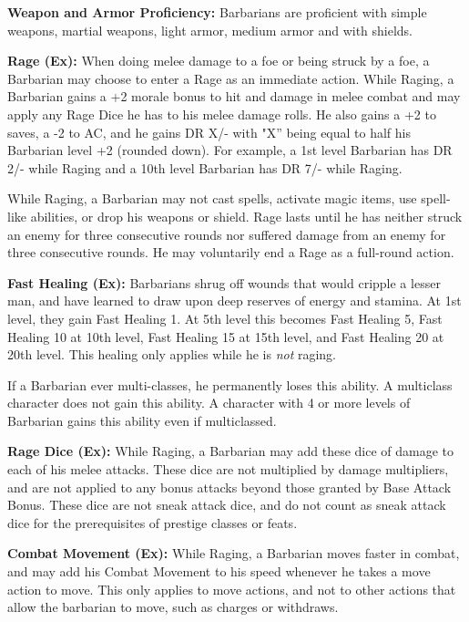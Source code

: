 \classfeatures

\textbf{Weapon and Armor Proficiency:} Barbarians are proficient with simple weapons, martial weapons, light armor, medium armor and with shields.

\textbf{Rage (Ex):} When doing melee damage to a foe or being struck by a foe, a Barbarian may choose to enter a Rage as an immediate action. While Raging, a Barbarian gains a +2 morale bonus to hit and damage in melee combat and may apply any Rage Dice he has to his melee damage rolls. He also gains a +2 to saves, a -2 to AC, and he gains DR X/- with "X'' being equal to half his Barbarian level +2 (rounded down). For example, a 1st level Barbarian has DR 2/- while Raging and a 10th level Barbarian has DR 7/- while Raging.

While Raging, a Barbarian may not cast spells, activate magic items, use spell-like abilities, or drop his weapons or shield. Rage lasts until he has neither struck an enemy for three consecutive rounds nor suffered damage from an enemy for three consecutive rounds. He may voluntarily end a Rage as a full-round action.

\textbf{Fast Healing (Ex):} Barbarians shrug off wounds that would cripple a lesser man, and have learned to draw upon deep reserves of energy and stamina. At 1st level, they gain Fast Healing 1. At 5th level this becomes Fast Healing 5, Fast Healing 10 at 10th level, Fast Healing 15 at 15th level, and Fast Healing 20 at 20th level. This healing only applies while he is \textit{not} raging.

If a Barbarian ever multi-classes, he permanently loses this ability. A multiclass character does not gain this ability. A character with 4 or more levels of Barbarian gains this ability even if multiclassed.

\textbf{Rage Dice (Ex):} While Raging, a Barbarian may add these dice of damage to each of his melee attacks. These dice are not multiplied by damage multipliers, and are not applied to any bonus attacks beyond those granted by Base Attack Bonus. These dice are not sneak attack dice, and do not count as sneak attack dice for the prerequisites of prestige classes or feats.

\textbf{Combat Movement (Ex):} While Raging, a Barbarian moves faster in combat, and may add his Combat Movement to his speed whenever he takes a move action to move. This only applies to move actions, and not to other actions that allow the barbarian to move, such as charges or withdraws.

